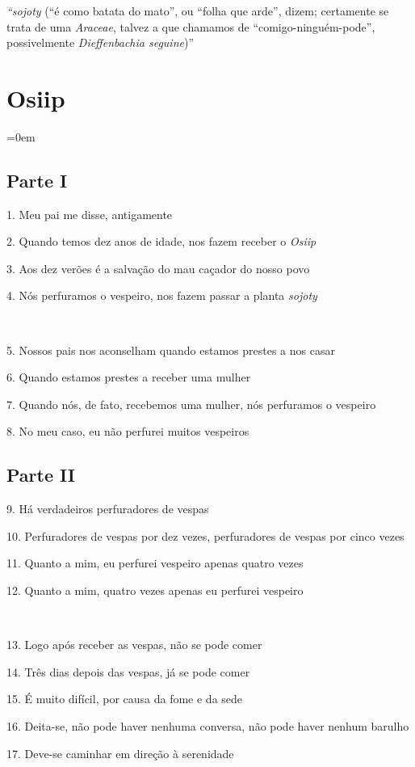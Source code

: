 \emph{``sojoty} (``é como batata do mato'', ou ``folha que arde'',
dizem; certamente se trata de uma \emph{Araceae}, talvez a que chamamos
de ``comigo-ninguém-pode'', possivelmente \emph{Dieffenbachia
seguine})''

\chapter*{Osiip}\parindent=0em

\section{Parte I}

1. Meu pai me disse, antigamente

2. Quando temos dez anos de idade, nos fazem receber o \emph{Osiip}

3. Aos dez verões é a salvação do mau caçador do nosso povo

4. Nós perfuramos o vespeiro, nos fazem passar a planta \emph{sojoty}

~

5. Nossos pais nos aconselham quando estamos prestes a nos casar

6. Quando estamos prestes a receber uma mulher

7. Quando nós, de fato, recebemos uma mulher, nós perfuramos o vespeiro

8. No meu caso, eu não perfurei muitos vespeiros

\section{Parte II}

9. Há verdadeiros perfuradores de vespas

10. Perfuradores de vespas por dez vezes, perfuradores de vespas por cinco vezes

11. Quanto a mim, eu perfurei vespeiro apenas quatro vezes

12. Quanto a mim, quatro vezes apenas eu perfurei vespeiro

~

13. Logo após receber as vespas, não se pode comer

14. Três dias depois das vespas, já se pode comer

15. É muito difícil, por causa da fome e da sede

16. Deita-se, não pode haver nenhuma conversa, não pode haver nenhum
barulho

17. Deve-se caminhar em direção à serenidade

